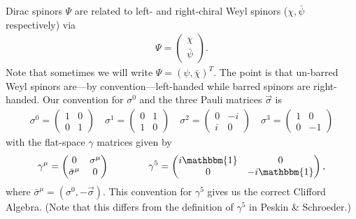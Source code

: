 \documentclass[12pt, oneside]{report}    %
\begin{document}
Dirac spinors $\Psi$ are related to left- and right-chiral Weyl spinors ($\chi, \bar\psi$ respectively) via
\begin{align}
    \Psi = \begin{pmatrix}
        \chi \\
        \bar\psi
    \end{pmatrix}.
\end{align}
Note that sometimes we will write $\Psi=(\psi,\bar\chi)^T$. The point is that un-barred Weyl spinors are---by convention---left-handed while barred spinors are right-handed. 
Our convention for $\sigma^0$ and the three Pauli matrices $\vec\sigma$ is
\begin{align}
    \sigma^0 = 
    \begin{pmatrix}
        1 & 0\\
        0 & 1
    \end{pmatrix}
    \quad
    \sigma^1 = 
    \begin{pmatrix}
        0 & 1\\
        1 & 0
    \end{pmatrix}
    \quad
    \sigma^2 = 
    \begin{pmatrix}
        0 & -i\\
        i & 0
    \end{pmatrix}
    \quad
    \sigma^3 = 
    \begin{pmatrix}
        1 & 0\\
        0 & -1
    \end{pmatrix}
\end{align}
with the flat-space $\gamma$ matrices given by
\begin{align}
    \gamma^\mu =
    \begin{pmatrix}
        0 & \sigma^\mu \\
        \bar\sigma^\mu & 0 
    \end{pmatrix}
    \quad\quad\quad\quad
    \gamma^5=
    \begin{pmatrix}
        i\mathbbm{1} & 0 \\
        0 & -i\mathbbm{1}
    \end{pmatrix},
\end{align}
where $\bar\sigma^\mu = (\sigma^0, -\vec\sigma)$.
This convention for $\gamma^5$ gives us the correct Clifford Algebra. (Note that this differs from the definition of $\gamma^5$ in Peskin \& Schroeder.)
\end{document}
